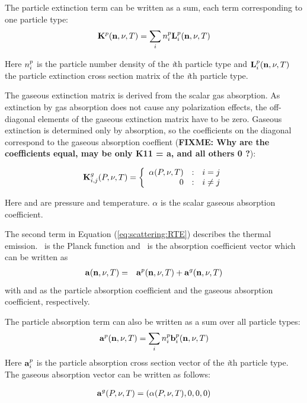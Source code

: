 The particle extinction term can be written as a sum, each term
corresponding to one particle type:
\begin{eqnarray}
  {\bf K}^{p}({\bf n}, \nu, T) = \sum_i n^p_i {\bf L}^{p}_i ({\bf n}, \nu, T)
\end{eqnarray}

Here $n^p_i$ is the particle number density of the {\sl i}th
particle type and ${\bf L}^{p}_i({\bf n}, \nu, T)$ the particle extinction cross
section matrix of the {\sl i}th particle type.


The gaseous extinction matrix is derived from the scalar gas
absorption. As extinction by gas absorption does not cause any
polarization effects, the off-diagonal elements of the gaseous
extinction matrix have to be zero. Gaseous extinction is determined
only by absorption, so the coefficients on the diagonal correspond to
the gaseous absorption coeffient ({\bf FIXME: Why are the coefficients
  equal, may be only K11 = a, and all others 0 ?}):

\[
\aExtMat{g}_{i,j}(\Prs, \Frq, \Tmp) =
\left\{\begin{array}{r@{\quad:\quad}l} \alpha(\Prs, \Frq, \Tmp) & i =
    j \\ 0 & i \not= j \end{array} \right.
\]

Here \Prs and \Tmp are pressure and temperature. $\alpha$ is the
scalar gaseous absorption coefficient.

The second term in Equation (\ref{eq:scattering:RTE}) describes the
thermal emission. \Planck\ is the Planck function and \AbsVec\ is the
absorption coefficient vector which can be written as
\begin{eqnarray}
  {\bf a} ({\bf n}, \nu, T)  &=& {\bf a}^{p} ({\bf n}, \nu, T) + {\bf a}^{g} ({\bf n}, \nu, T) 
\end{eqnarray}
with  and  as the particle absorption
coefficient and the gaseous absorption coefficient, respectively.

The particle absorption term can also be written as a sum over all
particle types:
\begin{eqnarray}
  {\bf a}^{p}({\bf n}, \nu, T) = \sum_i n^p_i {\bf b}^{p}_i ({\bf n}, \nu, T)
\end{eqnarray}
Here ${\bf a}^{p}_i$ is the particle absorption cross section vector
of the {\sl i}th particle type.  The gaseous absorption vector can be
written as follows:

\begin{eqnarray}
  {\bf a}^{g}(P, \nu, T)  = (\alpha(P, \nu, T), 0, 0, 0) 
\end{eqnarray}


